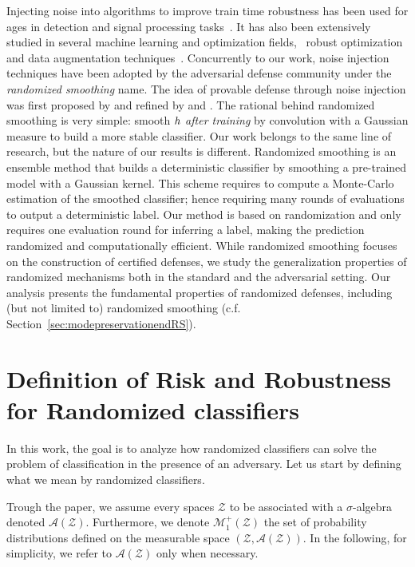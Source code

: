 Injecting noise into algorithms to improve train time robustness has been used for ages in detection and signal processing tasks~\citep{ZozoA99,ChapR04,MitaK98,grandvalet1997noise}. It has also been extensively studied in several machine learning and optimization fields, \eg~robust optimization~\citep{ben2009robust} and data augmentation techniques~\citep{Perez2017TheEO}. Concurrently to our work, noise injection techniques have been adopted by the adversarial defense community under the \emph{randomized smoothing} name. The idea of provable defense through noise injection was first proposed by \cite{lecuyer2019certified} and refined by \cite{li2019certified,KolterRandomizedSmoothing,salman2019provably} and \cite{yang2020randomized}. The rational behind randomized smoothing is very simple: smooth ${h}$ \emph{after training} by convolution with a Gaussian measure to build a more stable classifier. Our work belongs to the same line of research, but the nature of our results is different. Randomized smoothing is an ensemble method that builds a deterministic classifier by smoothing a pre-trained model with a Gaussian kernel. This scheme requires to compute a Monte-Carlo estimation of the smoothed classifier; hence requiring many rounds of evaluations to output a deterministic label. Our method is based on randomization and only requires one evaluation round for inferring a label, making the prediction randomized and computationally efficient. While randomized smoothing focuses on the construction of certified defenses, we study the generalization properties of randomized mechanisms both in the standard and the adversarial setting. Our analysis presents the fundamental properties of randomized defenses, including (but not limited to) randomized smoothing (c.f. Section~\ref{sec:modepreservationendRS}).

\section{Definition of Risk and Robustness for Randomized classifiers}
\label{section::RiskforRandomClassifiers}
In this work, the goal is to analyze how randomized classifiers can solve the problem of classification in the presence of an adversary. Let us start by defining what we mean by randomized classifiers.

\begin{rmq}
Trough the paper, we assume every spaces $\mathcal{Z}$ to be associated with a $\sigma$-algebra denoted $\mathcal{A}\left( \mathcal{Z}\right)$. Furthermore, we denote $\mathcal{M}^+_1\left(\mathcal{Z} \right)$ the set of probability distributions defined on the measurable space $\left(\mathcal{Z},\mathcal{A}\left(\mathcal{Z}\right)\right)$. In the following, for simplicity, we  refer to $\mathcal{A}\left(\mathcal{Z}\right)$ only when necessary.
\end{rmq}


